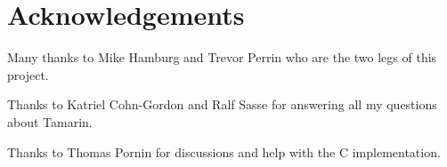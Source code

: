 \documentclass{article}
\begin{document}
\section*{Acknowledgements}

Many thanks to Mike Hamburg and Trevor Perrin who are the two legs of this project.

Thanks to Katriel Cohn-Gordon and Ralf Sasse for answering all my questions about Tamarin.

Thanks to Thomas Pornin for discussions and help with the C implementation.

\newpage
\printbibliography
\end{document}
